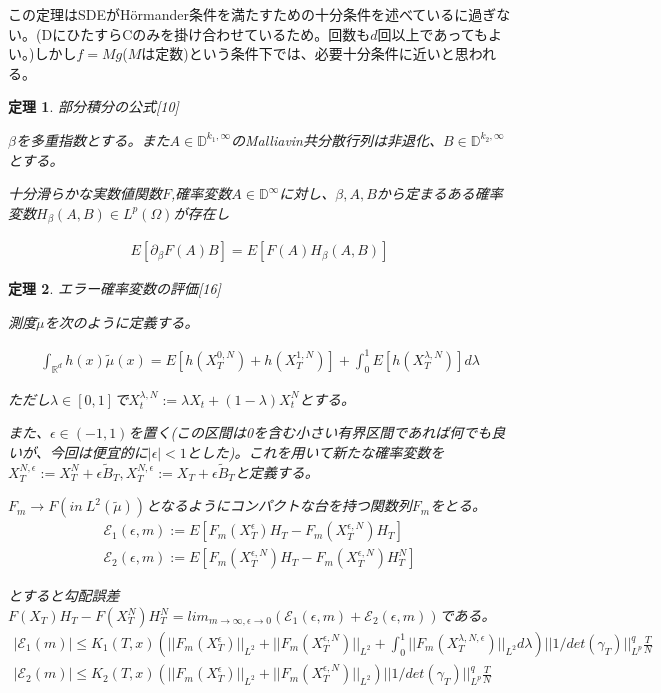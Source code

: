 \documentclass{jsarticle}
\newtheorem{theo}{定理}[section]
\begin{document}
この定理はSDEがHörmander条件を満たすための十分条件を述べているに過ぎない。(DにひたすらCのみを掛け合わせているため。回数も$d$回以上であってもよい。)しかし$f=Mg$($M$は定数)という条件下では、必要十分条件に近いと思われる。



\begin{theo} 部分積分の公式[10]

$\beta$を多重指数とする。また$A\in\mathbb{D}^{k_1,\infty}$のMalliavin共分散行列は非退化、$B\in\mathbb{D}^{k_2,\infty}$とする。

十分滑らかな実数値関数$F$,確率変数$A\in\mathbb{D}^\infty$に対し、$\beta,A,B$から定まるある確率変数$H_\beta(A,B)\in L^p(\Omega)$が存在し

\begin{align}
E[\partial_\beta F(A)B ]=E[F(A)H_\beta(A,B)]
\end{align}

\end{theo}






\begin{theo} エラー確率変数の評価[16]


測度$\tilde{\mu}$を次のように定義する。

\begin{align}
\int_{\mathbb{R}^d}h(x)\tilde{\mu}(x)=E[h(X^{0,N}_T)+h(X^{1,N}_T)]+\int^1_0E[h(X^{\lambda,N}_T)]d\lambda
\end{align}

ただし$\lambda\in[0,1]$で$X_t^{\lambda,N}:=\lambda X_t+(1-\lambda)X^N_t$とする。


また、$\epsilon\in(-1,1)$を置く(この区間は0を含む小さい有界区間であれば何でも良いが、今回は便宜的に$|\epsilon|<1$とした)。これを用いて新たな確率変数を$X_T^{N,\epsilon}:=X_T^{N}+\epsilon \tilde{B}_T,X_T^{N,\epsilon}:=X_T+\epsilon \tilde{B}_T$と定義する。


$F_m\to F (in\ L^2(\tilde{\mu}))$となるようにコンパクトな台を持つ関数列$F_m$をとる。
\begin{align}
\mathcal{E}_1(\epsilon,m):=E[F_m(X^\epsilon_T)H_T-F_m(X^{\epsilon,N}_T)H_T]\\
\mathcal{E}_2(\epsilon,m):=E[F_m(X^{\epsilon,N}_T)H_T-F_m(X^{\epsilon,N}_T)H^N_T]
\end{align}

とすると勾配誤差$F(X_T)H_T-F(X^N_T)H^N_T=lim_{m\to\infty,\epsilon\to0}(\mathcal{E}_1(\epsilon,m)+\mathcal{E}_2(\epsilon,m))$である。
\begin{align}
|\mathcal{E}_1(m)|\leq K_1(T,x)(||F_m(X^\epsilon_T)||_{L^2}+||F_m(X^{\epsilon,N}_T)||_{L^2}+\int^1_0||F_m(X^{\lambda,N,\epsilon}_T)||_{L^2}d\lambda )||1/det(\gamma_T)||^q_{L^p}\frac{T}{N}\\
|\mathcal{E}_2(m)|\leq K_2(T,x)(||F_m(X^\epsilon_T)||_{L^2}+||F_m(X^{\epsilon,N}_T)||_{L^2} )||1/det(\gamma_T)||^q_{L^p}\frac{T}{N}
\end{align}
\end{theo}
\end{document}
